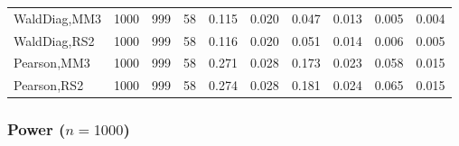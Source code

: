 \documentclass[
]{article}
\begin{document}
\begin{table}[H]
{\begin{tabular}[t]{lrrrrrrlrr}
\hspace{1em}WaldDiag,MM3 & 1000 & 999 & 58 & 0.115 & 0.020 & 0.047 & 0.013 & 0.005 & 0.004\\
\hspace{1em}WaldDiag,RS2 & 1000 & 999 & 58 & 0.116 & 0.020 & 0.051 & 0.014 & 0.006 & 0.005\\
\hspace{1em}Pearson,MM3 & 1000 & 999 & 58 & 0.271 & 0.028 & 0.173 & 0.023 & 0.058 & 0.015\\
\hspace{1em}Pearson,RS2 & 1000 & 999 & 58 & 0.274 & 0.028 & 0.181 & 0.024 & 0.065 & 0.015\\
\bottomrule
\end{tabular}}
\endgroup{}
\end{table}

\hypertarget{power-n1000-2}{%
\subsubsection{\texorpdfstring{Power
(\(n=1000\))}{Power (n=1000)}}\label{power-n1000-2}}
\end{document}
